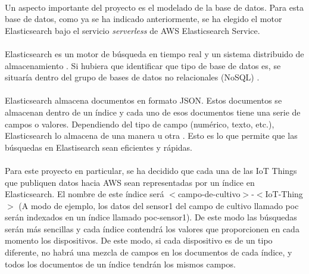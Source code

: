 \documentclass[../../memoria.tex]{subfiles}
\begin{document}
\paragraph{}
Un aspecto importante del proyecto es el modelado de la base de datos. Para esta base de datos, como ya se ha indicado anteriormente, se ha elegido el motor Elasticsearch bajo el servicio \textit{serverless} de AWS Elasticsearch Service.

\paragraph{}
Elasticsearch es un motor de búsqueda en tiempo real y un sistema distribuido de almacenamiento \cite{elastic}. Si hubiera que identificar que tipo de base de datos es, se situaría dentro del grupo de bases de datos no relacionales (NoSQL) \cite{nosql}.

\paragraph{}
Elasticsearch almacena documentos en formato JSON. Estos documentos se almacenan dentro de un índice y cada uno de esos documentos tiene una serie de campos o valores. Dependiendo del tipo de campo (numérico, texto, etc.), Elasticsearch lo almacena de una manera u otra \cite{elasticdata}. Esto es lo que permite que las búsquedas en Elastisearch sean eficientes y rápidas.

\paragraph{}
Para este proyecto en particular, se ha decidido que cada una de las IoT Things que publiquen datos hacia AWS sean representadas por un índice en Elasticsearch. El nombre de este índice será $<$campo-de-cultivo$>$-$<$IoT-Thing$>$ (A modo de ejemplo, los datos del sensor1 del campo de cultivo llamado poc serán indexados en un índice llamado poc-sensor1). De este modo las búsquedas serán más sencillas y cada índice contendrá los valores que proporcionen en cada momento los dispositivos. De este modo, si cada dispositivo es de un tipo diferente, no habrá una mezcla de campos en los documentos de cada índice, y todos los documentos de un índice tendrán los mismos campos.
\end{document}
